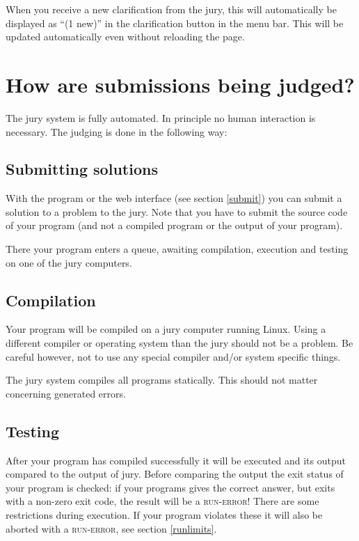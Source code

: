 When you receive a new clarification from the jury, this will
automatically be displayed as ``(1 new)'' in the clarification button
in the menu bar. This will be updated automatically even without reloading
the page.

\section{How are submissions being judged?}

The \DOMjudge jury system is fully automated. In principle no human
interaction is necessary. The judging is done in the following way:

\subsection{Submitting solutions}

With the  program or the web interface (see section
\ref{submit}) you can submit a solution to a problem to the jury.
Note that you have to submit the source code of your program
(and not a compiled program or the output of your program).

There your program enters a queue, awaiting compilation, execution and testing
on one of the jury computers.

\subsection{Compilation}

Your program will be compiled on a jury computer running Linux.
Using a different compiler or operating system than the jury should
not be a problem. Be careful however, not to use any special compiler
and/or system specific things.

The jury system compiles all programs statically. This should not
matter concerning generated errors.

\subsection{Testing}

After your program has compiled successfully it will be executed and
its output compared to the output of jury. Before comparing the
output the exit status of your program is checked: if your programs
gives the correct answer, but exits with a non-zero exit code, the
result will be a \textsc{run-error}! There are some restrictions during
execution. If your program violates these it will also be aborted
with a \textsc{run-error}, see section \ref{runlimits}.

